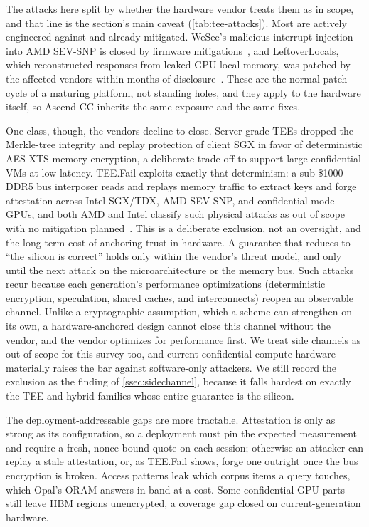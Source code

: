 The attacks here split by whether the hardware vendor treats them as in scope, and that line is
the section's main caveat (\cref{tab:tee-attacks}). Most are actively engineered against and
already mitigated. WeSee's malicious-interrupt injection into AMD SEV-SNP is closed by firmware
mitigations~\citep{wesee}, and LeftoverLocals, which reconstructed responses from leaked GPU local
memory, was patched by the affected vendors within months of disclosure~\citep{leftoverlocals}.
These are the normal patch cycle of a maturing platform, not standing holes, and they apply to
the hardware itself, so Ascend-CC inherits the same exposure and the same fixes.

One class, though, the vendors decline to close. Server-grade TEEs dropped the Merkle-tree
integrity and replay protection of client SGX in favor of deterministic AES-XTS memory
encryption, a deliberate trade-off to support large confidential VMs at low latency. TEE.Fail
exploits exactly that determinism: a sub-\$1000 DDR5 bus interposer reads and replays memory
traffic to extract keys and forge attestation across Intel SGX/TDX, AMD SEV-SNP, and
confidential-mode GPUs, and both AMD and Intel classify such physical attacks as out of scope with
no mitigation planned~\citep{tee_fail}. This is a deliberate exclusion, not an oversight, and the
long-term cost of anchoring trust in hardware. A guarantee that reduces to ``the silicon is correct'' holds only within the vendor's
threat model, and only until the next attack on the microarchitecture or the memory bus. Such
attacks recur because each generation's performance optimizations (deterministic encryption,
speculation, shared caches, and interconnects) reopen an observable channel. Unlike a
cryptographic assumption, which a scheme can strengthen on its own, a hardware-anchored design
cannot close this channel without the vendor, and the vendor optimizes for performance first. We
treat side channels as out of scope for this survey too, and current confidential-compute hardware
materially raises the bar against software-only attackers. We still record the exclusion as the
finding of \cref{ssec:sidechannel}, because it falls hardest on exactly the TEE and hybrid families
whose entire guarantee is the silicon.

The deployment-addressable gaps are more tractable. Attestation is only as strong as its
configuration, so a deployment must pin the expected measurement and require a fresh, nonce-bound
quote on each session; otherwise an attacker can replay a stale attestation, or, as TEE.Fail
shows, forge one outright once the bus encryption is broken. Access patterns leak which corpus
items a query touches, which Opal's ORAM answers in-band at a cost. Some confidential-GPU parts
still leave HBM regions unencrypted, a coverage gap closed on current-generation hardware.


